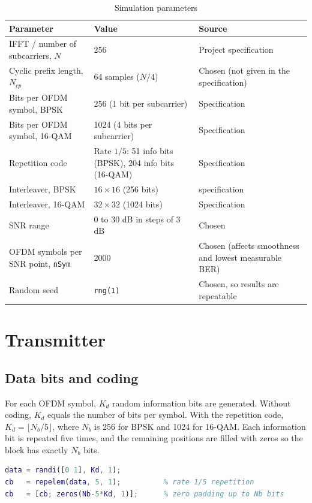 \documentclass[11pt,a4paper]{article}
\begin{document}
\begin{table}[H]
\centering
\caption{Simulation parameters}
\begin{tabular}{p{5.6cm} p{4.6cm} p{4.6cm}}
\toprule
\textbf{Parameter} & \textbf{Value} & \textbf{Source} \\
\midrule
IFFT / number of subcarriers, $N$ & 256 & Project specification \\
Cyclic prefix length, $N_{cp}$ & 64 samples ($N/4$) & Chosen (not given in the specification) \\
Bits per OFDM symbol, BPSK & 256 (1 bit per subcarrier) & Specification \\
Bits per OFDM symbol, 16-QAM & 1024 (4 bits per subcarrier) & Specification \\
Repetition code & Rate $1/5$: 51 info bits (BPSK), 204 info bits (16-QAM) & Specification \\
Interleaver, BPSK & $16 \times 16$ (256 bits) & specification  \\
Interleaver, 16-QAM & $32 \times 32$ (1024 bits) & Specification \\
SNR range & 0 to 30 dB in steps of 3 dB & Chosen \\
OFDM symbols per SNR point, \texttt{nSym} & 2000 & Chosen (affects smoothness and lowest measurable BER) \\
Random seed & \texttt{rng(1)} & Chosen, so results are repeatable \\
\bottomrule
\end{tabular}
\end{table}

\section{Transmitter}

\subsection{Data bits and coding}

For each OFDM symbol, $K_d$ random information bits are generated. Without coding, $K_d$ equals the number of bits per symbol. With the repetition code, $K_d = \lfloor N_b/5 \rfloor$, where $N_b$ is 256 for BPSK and 1024 for 16-QAM. Each information bit is repeated five times, and the remaining positions are filled with zeros so the block has exactly $N_b$ bits.

\begin{lstlisting}[language=Matlab]
data = randi([0 1], Kd, 1);
cb   = repelem(data, 5, 1);          % rate 1/5 repetition
cb   = [cb; zeros(Nb-5*Kd, 1)];      % zero padding up to Nb bits
\end{lstlisting}
\end{document}
